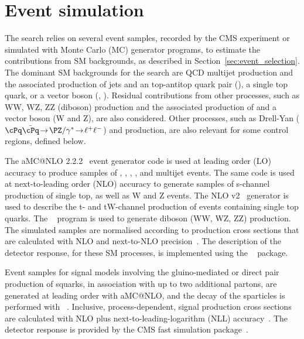\section{Event simulation}
\label{sec:event_simulation}

The search relies on several event samples, recorded by the CMS
experiment or simulated with Monte Carlo (MC) generator programs, to
estimate the contributions from SM backgrounds, as described in
Section~\ref{sec:event_selection}.
The dominant SM backgrounds for the search are QCD multijet production
and the associated production of jets and an top-antitop quark pair
(\ttbar), a single top quark, or a vector boson (\wlnu,
\znunu). Residual contributions from other processes, such as WW, WZ,
ZZ (diboson) production and the associated production of \ttbar and a
vector boson ({\ttbar}W and {\ttbar}Z), are also considered. Other
processes, such as Drell-Yan ($\cPq\bar{\cPq}\!  \rightarrow\!
\PZ/\gamma^*\!  \rightarrow\!  \ell^+\ell^-$) and \gj production, are
also relevant for some control regions, defined below.

The  aMC@NLO 2.2.2~\cite{Alwall2014} event generator code is
used at leading order (LO) accuracy to produce samples of \wj, \zj,
\gj, \ttbar, and multijet events. The same code is used at
next-to-leading order (NLO) accuracy to generate samples of s-channel
production of single top, as well as {\ttbar}W and {\ttbar}Z
events. The NLO \POWHEG v2~\cite{powheg, powheg_top_Wt} generator is
used to describe the t- and tW-channel production of events containing
single top quarks. The ~\cite{pythia} program is used to
generate diboson (WW, WZ, ZZ) production. The simulated samples are
normalised according to production cross sections that are calculated
with NLO and next-to-NLO precision~\cite{Alwall2014, wphys, fewz,
  wwxs, top++, nlotop, powheg_top_Wt}. The description of the detector
response, for these SM processes, is implemented using the
\GEANTfour~\cite{geant} package.

Event samples for signal models involving the gluino-mediated or
direct pair production of squarks, in association with up to two
additional partons, are generated at leading order with 
aMC@NLO, and the decay of the sparticles is performed with ~\cite{pythia}. Inclusive, process-dependent, signal production
cross sections are calculated with NLO plus next-to-leading-logarithm
(NLL) accuracy~\cite{Beenakker:1996ch, PhysRevLett.102.111802,
  PhysRevD.80.095004, 1126-6708-2009-12-041,
  doi:10.1142/S0217751X11053560, susynlo}. The detector response is
provided by the CMS fast simulation package~\cite{fastsim}.

